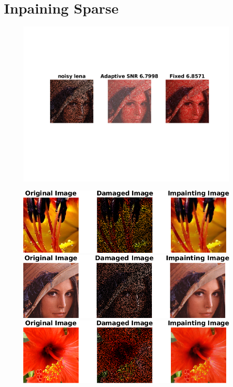 \documentclass[a4paper,12pt]{article}
\begin{document}
\section{Inpaining Sparse}
\begin{figure}[t]
        \centering
        \includegraphics{../Results/inpainint_sparce.png}
		\label{fig:inpaint_sparce}
\end{figure}



\begin{figure}[t]
        \centering
        \includegraphics{../Results/Inpainting_pdual_flowers_evolution.png}
        \includegraphics{../Results/Inpainting_pdual_lena_evolution.png}
        \includegraphics{../Results/Inpainting_pdual_hibiscus_evolution.png}
		\label{fig:evolve1}
\end{figure}
\end{document}
